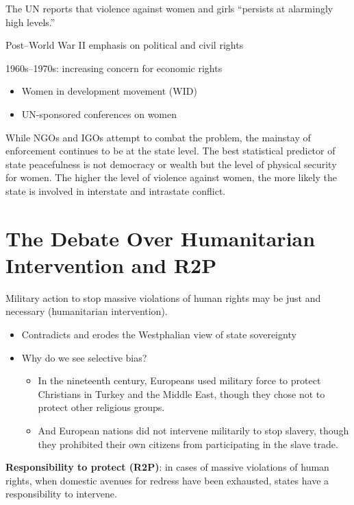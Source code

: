 \documentclass[
]{book}
\begin{document}
The UN reports that violence against women and girls ``persists at alarmingly high levels.''

Post--World War II emphasis on political and civil rights

1960s--1970s: increasing concern for economic rights

\begin{itemize}
\item
  Women in development movement (WID)
\item
  UN-sponsored conferences on women
\end{itemize}

While NGOs and IGOs attempt to combat the problem, the mainstay of enforcement continues to be at the state level. The best statistical predictor of state peacefulness is not democracy or wealth but the level of physical security for women. The higher the level of violence against women, the more likely the state is involved in interstate and intrastate conflict.

\hypertarget{the-debate-over-humanitarian-intervention-and-r2p}{%
\section{The Debate Over Humanitarian Intervention and R2P}\label{the-debate-over-humanitarian-intervention-and-r2p}}

Military action to stop massive violations of human rights may be just and necessary (humanitarian intervention).

\begin{itemize}
\item
  Contradicts and erodes the Westphalian view of state sovereignty
\item
  Why do we see selective bias?

  \begin{itemize}
  \item
    In the nineteenth century, Europeans used military force to protect Christians in Turkey and the Middle East, though they chose not to protect other religious groups.
  \item
    And European nations did not intervene militarily to stop slavery, though they prohibited their own citizens from participating in the slave trade.
  \end{itemize}
\end{itemize}

\textbf{Responsibility to protect (R2P)}: in cases of massive violations of human rights, when domestic avenues for redress have been exhausted, states have a responsibility to intervene.
\end{document}
